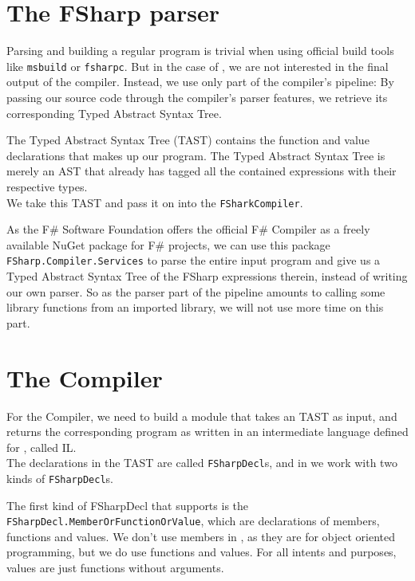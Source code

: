 \section{The FSharp parser}
Parsing and building a regular \fsharp{} program is trivial when using official build tools like
\texttt{msbuild} or \texttt{fsharpc}.
But in the case of \fshark{}, we are not interested in the final output of the
\fsharp{} compiler. Instead, we use only part of the \fsharp{} compiler's
pipeline: By passing our \fshark{} source code through the \fsharp{} compiler's
parser features, we retrieve its corresponding Typed Abstract Syntax Tree.

The Typed Abstract Syntax Tree (TAST) contains the function and value declarations that makes up 
our \fshark{} program.
The Typed Abstract Syntax Tree is merely an AST that already has tagged all the
contained expressions with their respective types.\\
We take this TAST and pass it on into the \texttt{FSharkCompiler}.

As the F\# Software Foundation offers the official F\# Compiler as a freely
available NuGet package for F\# projects, we can use this package
\texttt{FSharp.Compiler.Services} to parse the entire input \fshark{} program and
give us a Typed Abstract Syntax Tree of the FSharp expressions therein, instead
of writing our own parser. So as the \fsharp{} parser part of the pipeline amounts to calling some library
functions from an imported library, we will not use more time on this part.

\section{The \fshark{}Compiler}
For the \fshark{}Compiler, we need to build a module that takes an \fsharp{}
TAST as input, and returns the corresponding program as written in an
intermediate language defined for \fshark{}, called \fshark{}IL.\\
The declarations in the TAST are called \texttt{FSharpDecl}s, and in \fshark{}
we work with two kinds of \texttt{FSharpDecl}s.

The first kind of FSharpDecl that \fshark{} supports is the \texttt{FSharpDecl.MemberOrFunctionOrValue}, which are
declarations of members, functions and values. We don't use members in
\fshark{}, as they are for object oriented \fsharp{} programming, but we do use
functions and values. For all intents and purposes, \fsharp{} values are just
functions without arguments.

